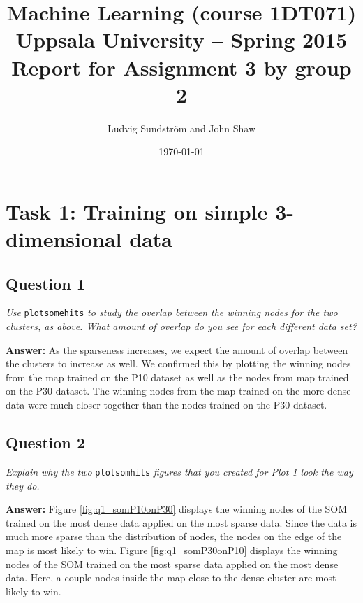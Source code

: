 \documentclass[a4paper]{article}
\title{Machine Learning (course 1DT071)
Uppsala University – Spring 2015
Report for Assignment 3 by group 2}
\author{Ludvig Sundstr\"{o}m and John Shaw}
\date{\today}
\begin{document}
\maketitle

\section*{Task 1: Training on simple 3-dimensional data}

\subsection*{Question 1} 

\emph{Use } \texttt{plotsomehits} \emph{ to study the overlap between the winning nodes for the two clusters, as above. What amount of overlap do you see for each different data set?}

\textbf{Answer:} As the sparseness increases, we expect the amount of overlap between the clusters to increase as well. We confirmed this by plotting the winning nodes from the map trained on the P10 dataset as well as the nodes from map trained on the P30 dataset. The winning nodes from the map trained on the more dense data were much closer together than the nodes trained on the P30 dataset. 

\subsection*{Question 2}
\emph{Explain why the two }\texttt{plotsomhits} \emph{ figures that you created for Plot 1 look the way they do.}

\textbf{Answer:} Figure \ref{fig:q1_somP10onP30} displays the winning nodes of the SOM trained on the most dense data applied on the most sparse data. Since the data is much more sparse than the distribution of nodes, the nodes on the edge of the map is most likely to win. Figure \ref{fig:q1_somP30onP10} displays the winning nodes of the SOM trained on the most sparse data applied on the most dense data. Here, a couple nodes inside the map close to the dense cluster are most likely to win. 
\end{document}
